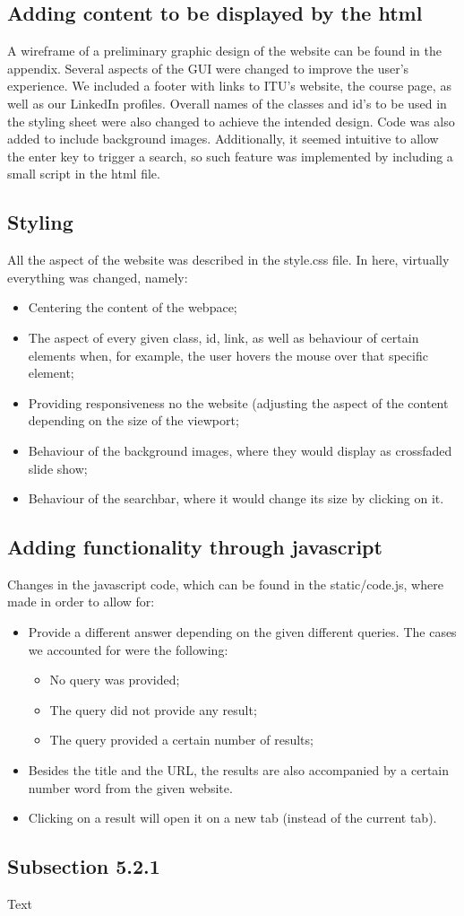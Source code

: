 \subsection{Adding content to be displayed by the html}
A wireframe of a preliminary graphic design of the website can be found in the appendix. Several aspects of the GUI were changed to improve the user's experience. We included a footer with links to ITU's website, the course page, as well as our LinkedIn profiles. Overall names of the classes and id's to be used in the styling sheet were also changed to achieve the intended design. Code was also added to include background images.
Additionally, it seemed intuitive to allow the enter key to trigger a search, so such feature was implemented by including a small script in the html file.

\subsection{Styling}
All the aspect of the website was described in the style.css file. In here, virtually everything was changed, namely:
\begin{itemize}
    \item Centering the content of the webpace;
    \item The aspect of every given class, id, link, as well as behaviour of certain elements when, for example, the user hovers the mouse over that specific element;
    \item Providing responsiveness no the website (adjusting the aspect of the content depending on the size of the viewport;
    \item Behaviour of the background images, where they would display as crossfaded slide show;
    \item Behaviour of the searchbar, where it would change its size by clicking on it.
\end{itemize}

\subsection{Adding functionality through javascript}
Changes in the javascript code, which can be found in the static/code.js, where made in order to allow for:
\begin{itemize}
    \item Provide a different answer depending on the given different queries. The cases we accounted for were the following:
    \begin{itemize}
        \item No query was provided;
        \item The query did not provide any result;
        \item The query provided a certain number of results;
    \end{itemize}
    \item Besides the title and the URL, the results are also accompanied by a certain number word from the given website.
    \item Clicking on a result will open it on a new tab (instead of the current tab).
\end{itemize}


\subsection{Subsection 5.2.1}
Text\\
